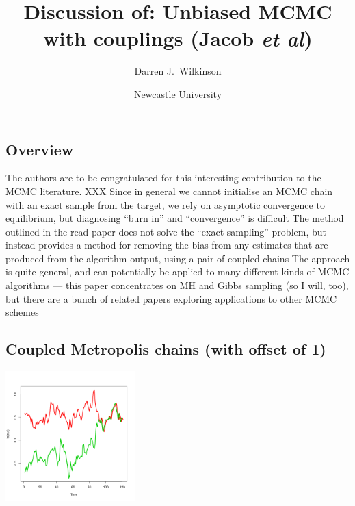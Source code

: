 \documentclass[11pt,a4paper]{article}
\title{Discussion of: Unbiased MCMC with couplings (Jacob \emph{et al})}
\author{Darren J.\ Wilkinson}
\date{Newcastle University}
\begin{document}
\maketitle

\subsection{Overview}

The authors are to be congratulated for this interesting contribution to the MCMC literature. XXX
Since in general we cannot initialise an MCMC chain with an exact sample from the target, we rely on asymptotic convergence to equilibrium, but diagnosing ``burn in'' and ``convergence'' is difficult
The method outlined in the read paper does not solve the ``exact sampling'' problem, but instead provides a method for removing the bias from any estimates that are produced from the algorithm output, using a pair of coupled chains
The approach is quite general, and can potentially be applied to many different kinds of MCMC algorithms --- this paper concentrates on MH and Gibbs sampling (so I will, too), but there are a bunch of related papers exploring applications to other MCMC schemes



\subsection{Coupled Metropolis chains (with offset of 1)}

\centerline{\includegraphics[height=5cm]{figs/coupled-mh}}
\end{document}
